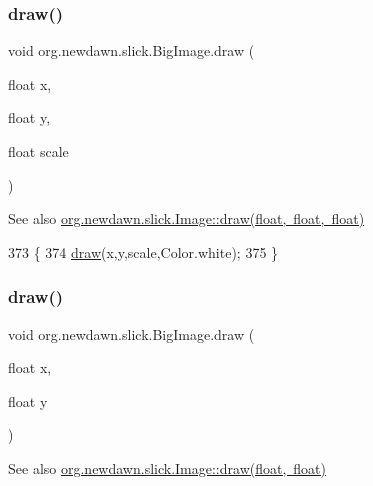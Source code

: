 \subsubsection{\texorpdfstring{draw()}{draw()}\hspace{0.1cm}{\footnotesize\ttfamily [8/10]}}
{\footnotesize\ttfamily void org.\+newdawn.\+slick.\+Big\+Image.\+draw (\begin{DoxyParamCaption}\item[{float}]{x,  }\item[{float}]{y,  }\item[{float}]{scale }\end{DoxyParamCaption})\hspace{0.3cm}{\ttfamily [inline]}}

\begin{DoxySeeAlso}{See also}
\mbox{\hyperlink{classorg_1_1newdawn_1_1slick_1_1_image_af9cb38b72eecd528e2f1c679ef373871}{org.\+newdawn.\+slick.\+Image\+::draw(float, float, float)}} 
\end{DoxySeeAlso}

\begin{DoxyCode}
373                                                     \{
374         \mbox{\hyperlink{classorg_1_1newdawn_1_1slick_1_1_big_image_a75b5b008adf93b038aa56e9cfefd1a1c}{draw}}(x,y,scale,Color.white);
375     \}
\end{DoxyCode}
\mbox{\label{classorg_1_1newdawn_1_1slick_1_1_big_image_a94aa674e521e409c45afcfd627b49772}} 
\subsubsection{\texorpdfstring{draw()}{draw()}\hspace{0.1cm}{\footnotesize\ttfamily [9/10]}}
{\footnotesize\ttfamily void org.\+newdawn.\+slick.\+Big\+Image.\+draw (\begin{DoxyParamCaption}\item[{float}]{x,  }\item[{float}]{y }\end{DoxyParamCaption})\hspace{0.3cm}{\ttfamily [inline]}}

\begin{DoxySeeAlso}{See also}
\mbox{\hyperlink{classorg_1_1newdawn_1_1slick_1_1_image_a47a2d7ef96a03050ac9718d2c22129e6}{org.\+newdawn.\+slick.\+Image\+::draw(float, float)}} 
\end{DoxySeeAlso}


